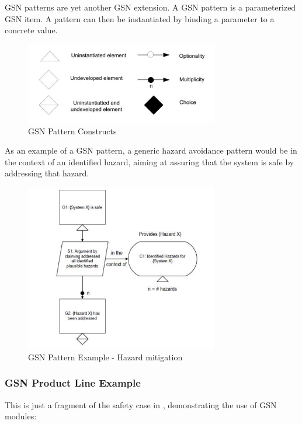 \documentclass[11pt]{article}
\begin{document}
GSN patterns are yet another GSN extension. A GSN pattern is a parameterized GSN item. A pattern can then be instantiated by binding a parameter to a concrete value.

\begin{figure}
  \centering
  \includegraphics[width=0.75\textwidth]{gsn-patterns}
  \caption{GSN Pattern Constructs}
\end{figure}

As an example of a GSN pattern, a generic hazard avoidance pattern would be in the context of an identified hazard, aiming at assuring that the system is safe by addressing that hazard.

\begin{figure}
  \centering
  \includegraphics[width=0.75\textwidth]{gsn-pattern-example}
  \caption{GSN Pattern Example - Hazard mitigation}
\end{figure}

\subsubsection{GSN Product Line Example}

This is just a fragment of the safety case in \cite{Gallucci_2013}, demonstrating the use of GSN modules:
\end{document}
